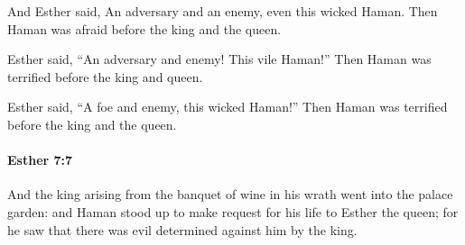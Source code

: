 			\begin{versebox}
					\item[BHS] 
					\item[LXX] 
					\item[ASV] And Esther said, An adversary and an enemy, even this wicked Haman. Then Haman was afraid before the king and the queen.
					\item[NIV] Esther said, “An adversary and enemy! This vile Haman!” Then Haman was terrified before the king and queen.
					\item[NRSV] Esther said, “A foe and enemy, this wicked Haman!” Then Haman was terrified before the king and the queen.
			\end{versebox}

		\paragraph{Esther 7:7} %
			\label{ESTHER-7-7}

			And the king arising from the banquet of wine in his wrath went into the palace garden: and Haman stood up to make request for his life to Esther the queen; for he saw that there was evil determined against him by the king.

